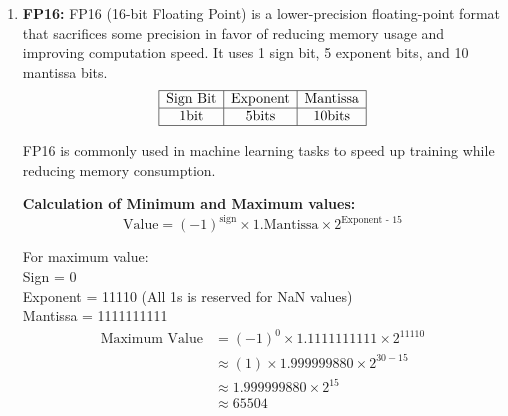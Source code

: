 \begin{enumerate}[label=\textbf{\roman*.}]
\item \textbf{FP16:}
    FP16 (16-bit Floating Point) is a lower-precision floating-point format that sacrifices some precision in favor of reducing memory usage and improving computation speed. It uses 1 sign bit, 5 exponent bits, and 10 mantissa bits.
    \[
    \begin{array}{|c|c|c|}
        \hline
        \text{Sign Bit} & \text{Exponent} & \text{Mantissa} \\
        \hline
        1 \text{bit} & 5 \text{bits} & 10 \text{bits} \\
        \hline
    \end{array}
    \]
    
    FP16 is commonly used in machine learning tasks to speed up training while reducing memory consumption.

    \textbf{Calculation of Minimum and Maximum values:}
    \[
    \text{Value} = (-1)^{\text{sign}} \times 1.\text{Mantissa} \times 2^{\text{Exponent - 15}}
    \]

    For maximum value:\\
    Sign = 0 \\
    Exponent = 11110 (All 1s is reserved for NaN values) \\
    Mantissa = 1111111111 
    \[
        \begin{aligned}
            \text{Maximum Value} &= (-1)^{0} \times 1.1111111111 \times 2^{11110} \\
            & \approx (1) \times 1.999999880 \times 2^{30 - 15} \\
            & \approx 1.999999880 \times 2^{15} \\
            & \approx 65504
        \end{aligned}
    \]


\end{enumerate}
